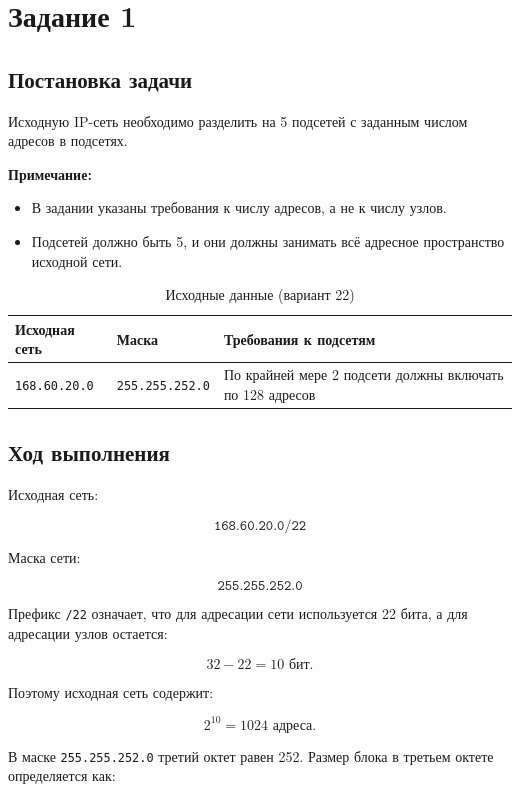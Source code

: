 \newpage
\section{Задание 1}

\subsection*{Постановка задачи}

Исходную IP-сеть необходимо разделить на 5 подсетей с заданным числом адресов в подсетях.

\noindent\textbf{Примечание:}
\begin{itemize}
    \item В задании указаны требования к числу адресов, а не к числу узлов.
    \item Подсетей должно быть 5, и они должны занимать всё адресное пространство исходной сети.
\end{itemize}

\begin{table}[H]
\centering
\begin{tabular}{|l|l|p{6.5cm}|}
\hline
\textbf{Исходная сеть} &
\textbf{Маска} &
\textbf{Требования к подсетям} \\ \hline
\texttt{168.60.20.0} &
\texttt{255.255.252.0} &
По крайней мере 2 подсети должны включать по 128 адресов
\\ \hline
\end{tabular}
\caption{Исходные данные (вариант 22)}
\label{tab:variant_data}
\end{table}

\subsection*{Ход выполнения}

Исходная сеть:

\[
\texttt{168.60.20.0/22}
\]

Маска сети:

\[
\texttt{255.255.252.0}
\]

Префикс \texttt{/22} означает, что для адресации сети используется 22 бита, а для адресации узлов остается:

\[
32 - 22 = 10 \text{ бит.}
\]

Поэтому исходная сеть содержит:

\[
2^{10} = 1024 \text{ адреса.}
\]


В маске \texttt{255.255.252.0} третий октет равен 252. Размер блока в третьем октете определяется как:

